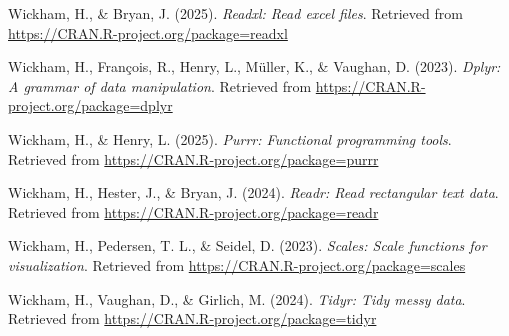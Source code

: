 \documentclass[
  man,floatsintext]{apa6}
\newlength{\cslhangindent}
\newenvironment{CSLReferences}[2] %
 {\begin{list}{}{%
  \setlength{\itemindent}{0pt}
  \setlength{\leftmargin}{0pt}
  \setlength{\parsep}{0pt}
  \ifodd #1
   \setlength{\leftmargin}{\cslhangindent}
   \setlength{\itemindent}{-1\cslhangindent}
  \fi
  \setlength{\itemsep}{#2\baselineskip}}}
 {\end{list}}
\begin{document}
\begin{CSLReferences}{1}{0}
Wickham, H., \& Bryan, J. (2025). \emph{Readxl: Read excel files}. Retrieved from \url{https://CRAN.R-project.org/package=readxl}

Wickham, H., François, R., Henry, L., Müller, K., \& Vaughan, D. (2023). \emph{Dplyr: A grammar of data manipulation}. Retrieved from \url{https://CRAN.R-project.org/package=dplyr}

Wickham, H., \& Henry, L. (2025). \emph{Purrr: Functional programming tools}. Retrieved from \url{https://CRAN.R-project.org/package=purrr}

Wickham, H., Hester, J., \& Bryan, J. (2024). \emph{Readr: Read rectangular text data}. Retrieved from \url{https://CRAN.R-project.org/package=readr}

Wickham, H., Pedersen, T. L., \& Seidel, D. (2023). \emph{Scales: Scale functions for visualization}. Retrieved from \url{https://CRAN.R-project.org/package=scales}

Wickham, H., Vaughan, D., \& Girlich, M. (2024). \emph{Tidyr: Tidy messy data}. Retrieved from \url{https://CRAN.R-project.org/package=tidyr}

\end{CSLReferences}
\end{document}
